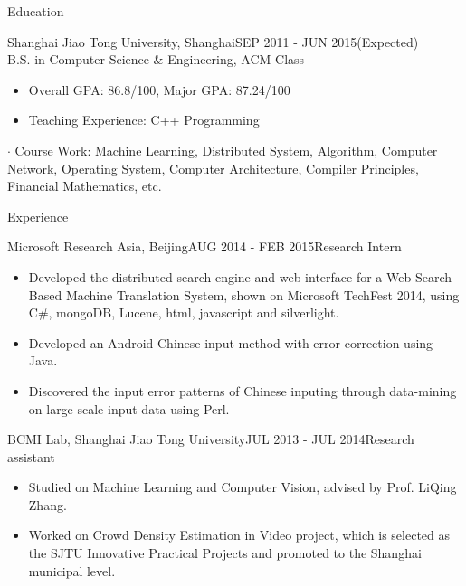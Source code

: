 \documentclass{resume} %
\begin{document}

\begin{rSection}{Education}

\begin{rSubsection}{Shanghai Jiao Tong University, Shanghai}{SEP 2011 - JUN 2015(Expected)}{}\\
B.S. in Computer Science \& Engineering, ACM Class 
\begin{itemize}
\item Overall GPA: 86.8/100, Major GPA: 87.24/100
\item Teaching Experience: C++ Programming
\end{itemize}
$\cdot$ Course Work: Machine Learning, Distributed System, Algorithm, Computer Network, Operating System, Computer Architecture, Compiler Principles, Financial Mathematics, etc.
\end{rSubsection}

\end{rSection}


\begin{rSection}{Experience}

\begin{rSubsection}{Microsoft Research Asia, Beijing}{AUG 2014 - FEB 2015}{Research Intern}
\begin{itemize}
\item Developed the distributed search engine and web interface for a Web Search Based Machine Translation System, shown on Microsoft TechFest 2014, using C\#, mongoDB, Lucene, html, javascript and silverlight.
\item Developed an Android Chinese input method with error correction using Java. 
\item Discovered the input error patterns of Chinese inputing through data-mining on large scale input data using Perl.\end{itemize}

\end{rSubsection}

\begin{rSubsection}{BCMI Lab, Shanghai Jiao Tong University}{JUL 2013 - JUL 2014}{Research assistant}
\begin{itemize}
\item Studied on Machine Learning and Computer Vision, advised by Prof. LiQing Zhang.
\item Worked on Crowd Density Estimation in Video project, which is selected as the SJTU Innovative Practical Projects and promoted to the Shanghai municipal level.
\end{itemize}
\end{rSubsection}

\end{rSection}
\end{document}
